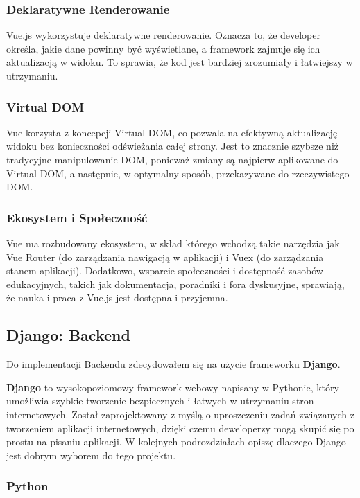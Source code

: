 \subsubsection*{Deklaratywne Renderowanie}

Vue.js wykorzystuje deklaratywne renderowanie. Oznacza to, że developer określa, jakie dane powinny być wyświetlane, a framework zajmuje się ich aktualizacją w widoku. To sprawia, że kod jest bardziej zrozumiały i łatwiejszy w utrzymaniu.

\subsubsection*{Virtual DOM}

Vue korzysta z koncepcji Virtual DOM, co pozwala na efektywną aktualizację widoku bez konieczności odświeżania całej strony. Jest to znacznie szybsze niż tradycyjne manipulowanie DOM, ponieważ zmiany są najpierw aplikowane do Virtual DOM, a następnie, w optymalny sposób, przekazywane do rzeczywistego DOM.

\subsubsection*{Ekosystem i Społeczność}

Vue ma rozbudowany ekosystem, w skład którego wchodzą takie narzędzia jak Vue Router (do zarządzania nawigacją w aplikacji) i Vuex (do zarządzania stanem aplikacji). Dodatkowo, wsparcie społeczności i dostępność zasobów edukacyjnych, takich jak dokumentacja, poradniki i fora dyskusyjne, sprawiają, że nauka i praca z Vue.js jest dostępna i przyjemna.


\newpage
\subsection{Django: Backend}

Do implementacji Backendu zdecydowałem się na użycie frameworku \textbf{Django}. 

\textbf{Django} to wysokopoziomowy framework webowy napisany w Pythonie, który umożliwia szybkie tworzenie bezpiecznych i łatwych w utrzymaniu stron internetowych. Został zaprojektowany z myślą o uproszczeniu zadań związanych z tworzeniem aplikacji internetowych, dzięki czemu deweloperzy mogą skupić się po prostu na pisaniu aplikacji. W kolejnych podrozdziałach opiszę dlaczego Django jest dobrym wyborem do tego projektu.


\subsubsection*{Python}

